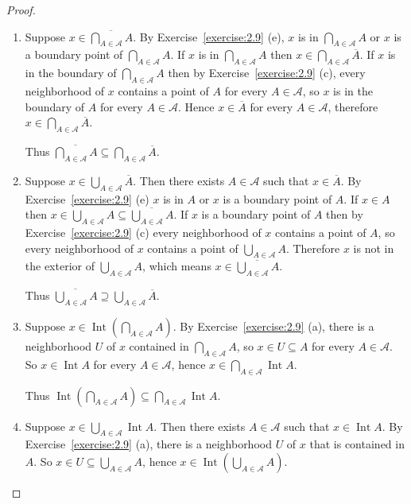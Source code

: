 \begin{proof}
	\begin{enumerate}[label={(\alph*)}]
		\item Suppose $x\in \overline{\bigcap_{A\in\mathscr{A}}A}$. By Exercise~\ref{exercise:2.9} (e), $x$ is in $\bigcap_{A\in\mathscr{A}}A$ or $x$ is a boundary point of $\bigcap_{A\in\mathscr{A}}A$. If $x$ is in $\bigcap_{A\in\mathscr{A}}A$ then $x\in \bigcap_{A\in\mathscr{A}}\overline{A}$. If $x$ is in the boundary of $\bigcap_{A\in\mathscr{A}}A$ then by Exercise~\ref{exercise:2.9} (c), every neighborhood of $x$ contains a point of $A$ for every $A\in\mathscr{A}$, so $x$ is in the boundary of $A$ for every $A\in\mathscr{A}$. Hence $x\in\overline{A}$ for every $A\in\mathscr{A}$, therefore $x\in \bigcap_{A\in\mathscr{A}}\overline{A}$.

		      Thus $\overline{\bigcap_{A\in\mathscr{A}}A} \subseteq \bigcap_{A\in\mathscr{A}}\overline{A}$.
		\item Suppose $x\in \bigcup_{A\in\mathscr{A}}\overline{A}$. Then there exists $A\in\mathscr{A}$ such that $x\in \overline{A}$. By Exercise~\ref{exercise:2.9} (e) $x$ is in $A$ or $x$ is a boundary point of $A$. If $x\in A$ then $x\in \bigcup_{A\in\mathscr{A}}A \subseteq \overline{\bigcup_{A\in\mathscr{A}}A}$. If $x$ is a boundary point of $A$ then by Exercise~\ref{exercise:2.9} (c) every neighborhood of $x$ contains a point of $A$, so every neighborhood of $x$ contains a point of $\bigcup_{A\in\mathscr{A}}A$. Therefore $x$ is not in the exterior of $\bigcup_{A\in\mathscr{A}}A$, which means $x\in \overline{\bigcup_{A\in\mathscr{A}}A}$.

		      Thus $\overline{\bigcup_{A\in\mathscr{A}}A} \supseteq \bigcup_{A\in\mathscr{A}}\overline{A}$.
		\item Suppose $x\in \operatorname{Int}\left(\bigcap_{A\in\mathscr{A}}A\right)$. By Exercise~\ref{exercise:2.9} (a), there is a neighborhood $U$ of $x$ contained in $\bigcap_{A\in\mathscr{A}}A$, so $x\in U\subseteq A$ for every $A\in\mathscr{A}$. So $x\in\operatorname{Int} A$ for every $A\in\mathscr{A}$, hence $x\in\bigcap_{A\in\mathscr{A}}\operatorname{Int} A$.

		      Thus $\operatorname{Int}\left(\bigcap_{A\in\mathscr{A}}A\right)\subseteq \bigcap_{A\in\mathscr{A}}\operatorname{Int}A$.
		\item Suppose $x\in \bigcup_{A\in\mathscr{A}}\operatorname{Int}A$. Then there exists $A\in\mathscr{A}$ such that $x\in \operatorname{Int}A$. By Exercise~\ref{exercise:2.9} (a), there is a neighborhood $U$ of $x$ that is contained in $A$. So $x\in U\subseteq \bigcup_{A\in\mathscr{A}}A$, hence $x\in \operatorname{Int}\left(\bigcup_{A\in\mathscr{A}}A\right)$.


\end{enumerate}
\end{proof}
